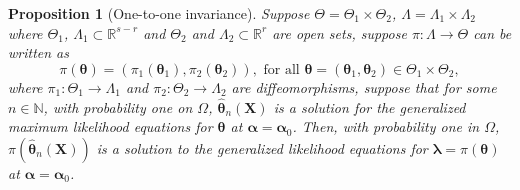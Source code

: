 \documentclass[12pt]{article} %
\newcommand{\bs}{\boldsymbol}
\newtheorem{proposition}{Proposition}
\theoremstyle{definition}
\begin{document}
\begin{proposition}[One-to-one invariance] Suppose $\Theta=\Theta_1\times \Theta_2$, $\Lambda=\Lambda_1\times \Lambda_2$ where  $\Theta_1$, $\Lambda_1\subset \mathbb{R}^{s-r}$ and $\Theta_2$ and $\Lambda_2\subset \mathbb{R}^r$ are open sets, suppose $\pi:\Lambda\to \Theta$ can be written as
 \begin{equation*}\pi(\bs{\theta})=(\pi_1(\bs{\theta}_1),\pi_2(\bs{\theta}_2)),\mbox{ for all }\bs{\theta}=(\bs{\theta}_1,\bs{\theta}_2)\in \Theta_1\times \Theta_2,
 \end{equation*}
where $\pi_1:\Theta_1\to \Lambda_1$ and $\pi_2:\Theta_2\to \Lambda_2$ are diffeomorphisms, suppose that for some $n\in \mathbb{N}$, with probability one on $\Omega$, $\bs{\hat{\theta}}_n(\bs{X})$ is a solution for the generalized maximum likelihood equations for $\bs{\theta}$ at $\bs{\alpha}=\bs{\alpha}_0$. Then, with probability one in $\Omega$, $\pi (\bs{\hat{\theta}}_n(\bs{X}))$ is a solution to the generalized likelihood equations for $\bs{\lambda}=\pi(\bs{\theta})$ at $\bs{\alpha}=\bs{\alpha}_0$.
\end{proposition}
\end{document}
